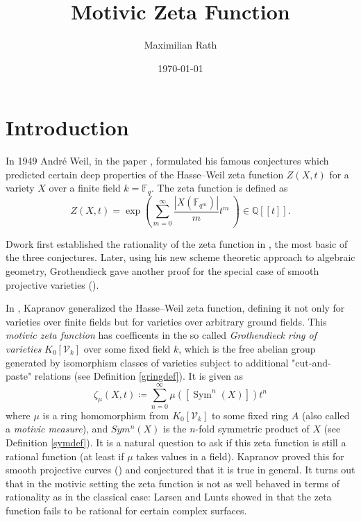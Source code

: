 \documentclass[11pt, a4paper, german, twoside]{article}
\author{Maximilian Rath}
\date{\today}
\title{Motivic Zeta Function}
\theoremstyle{plain}
\newtheorem{theorem}{Theorem}[section]
\theoremstyle{definition}
\newcommand{\gring}[1][k]{K_0[\mathcal{V}_#1]}
\DeclareMathOperator{\Sym}{Sym}
\begin{document}
\maketitle
\tableofcontents
\section{Introduction}

In 1949 Andr\'e Weil, in the paper \cite{weil1949}, formulated his famous conjectures
which predicted certain deep properties of the Hasse--Weil zeta function $Z(X,t)$ for a variety $X$ over a finite field $k = \mathbb{F}_q$.
The zeta function is defined as 
\[
    Z(X,t) = \exp \left(\sum_{m=0}^\infty \frac{|X(\mathbb{F}_{q^m})|}{m} t^m \ \right) \in \mathbb{Q}[[t]].
\]

Dwork first established the rationality of the zeta function in \cite{Dwork}, the most basic of the three conjectures. 
Later, using his new scheme theoretic approach to algebraic geometry, Grothendieck gave another proof for the special case of 
smooth projective varieties (\cite{GroRat}).


In \cite{kapranov}, Kapranov generalized the Hasse--Weil zeta function, defining it not only for varieties over finite fields
but for varieties over arbitrary ground fields. 
This \emph{motivic zeta function} has coefficents in the so called \emph{Grothendieck ring of varieties} $\gring[k]$ 
over some fixed field $k$, 
which is the free abelian group generated by isomorphism classes of varieties subject to additional "cut-and-paste" relations
(see Definition \ref{gringdef}). It is given as 
\[
    \zeta_{\mu}(X,t) \coloneqq \sum_{n=0}^{\infty} \mu \left( \left[ \Sym^n(X) \right] \right) t^n
\]
where $\mu$ is a ring homomorphism from $\gring[k]$ to some fixed ring $A$ (also called a \emph{motivic measure}), 
and $Sym^n(X)$ is the $n$-fold symmetric product of $X$ (see Definition \ref{symdef}). 
It is a natural question to ask if this zeta function is still a rational function (at least if $\mu$ takes values in a field).
Kapranov proved this for smooth projective curves (\cite[Thm 1.1.9]{kapranov}) and conjectured that it is true in general.
It turns out that in the motivic setting the zeta function is not as well behaved in terms of rationality as in the classical case:
Larsen and Lunts showed in \cite{MR1996804} that the zeta function fails to be rational for certain complex surfaces.
\end{document}

